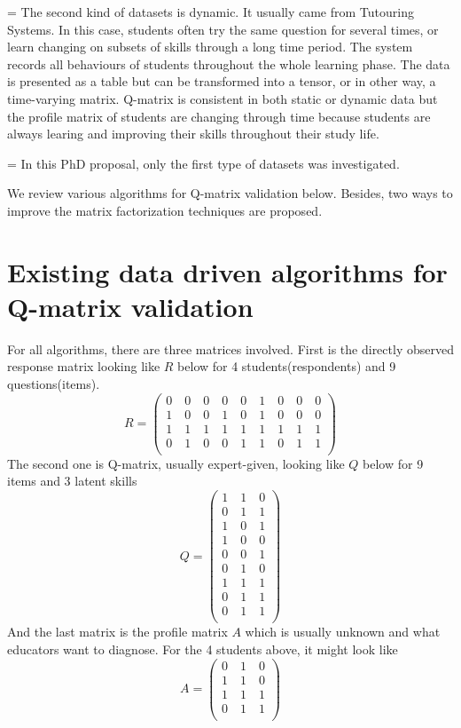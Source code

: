 \documentclass[11pt]{article}
\begin{document}
\parskip = \baselineskip 
The second kind of datasets is dynamic. It usually came from Tutouring Systems. In this case, students often try the same question for several times, or learn changing on subsets of skills through a long time period. The system records all behaviours of students throughout the whole learning phase. The data is presented as a table but can be transformed into a tensor, or in other way, a time-varying matrix. Q-matrix is consistent in both static or dynamic data but the profile matrix of students are changing through time because students are always learing and improving their skills throughout their study life.

\parskip = \baselineskip
In this PhD proposal, only the first type of datasets was investigated.

We review various algorithms for Q-matrix validation below. Besides, two ways to improve the matrix factorization techniques are proposed. 

\section{Existing data driven algorithms for Q-matrix validation}

For all algorithms, there are three matrices involved. First is the directly observed response matrix looking like $R$ below for 4 students(respondents) and 9 questions(items).
$$R=\begin{pmatrix}
0\quad 0\quad 0\quad 0\quad 0\quad 1\quad 0\quad 0\quad 0\\
1\quad 0\quad 0\quad 1\quad 0\quad 1\quad 0\quad 0\quad 0\\
1\quad 1\quad 1\quad 1\quad 1\quad 1\quad 1\quad 1\quad 1\\
0\quad 1\quad 0\quad 0\quad 1\quad 1\quad 0\quad 1\quad 1\\
\end{pmatrix}$$
The second one is Q-matrix, usually expert-given, looking like $Q$ below for 9 items and 3 latent skills
$$Q=\begin{pmatrix}
1\quad 1\quad 0\\
0\quad 1\quad 1\\
1\quad 0\quad 1\\
1\quad 0\quad 0\\
0\quad 0\quad 1\\
0\quad 1\quad 0\\
1\quad 1\quad 1\\
0\quad 1\quad 1\\
0\quad 1\quad 1\\
\end{pmatrix}$$
And the last matrix is the profile matrix $A$ which is usually unknown and what educators want to diagnose. For the 4 students above, it might look like
$$A=\begin{pmatrix}
0\quad 1\quad 0\\
1\quad 1\quad 0\\
1\quad 1\quad 1\\
0\quad 1\quad 1\\
\end{pmatrix}$$
\end{document}
